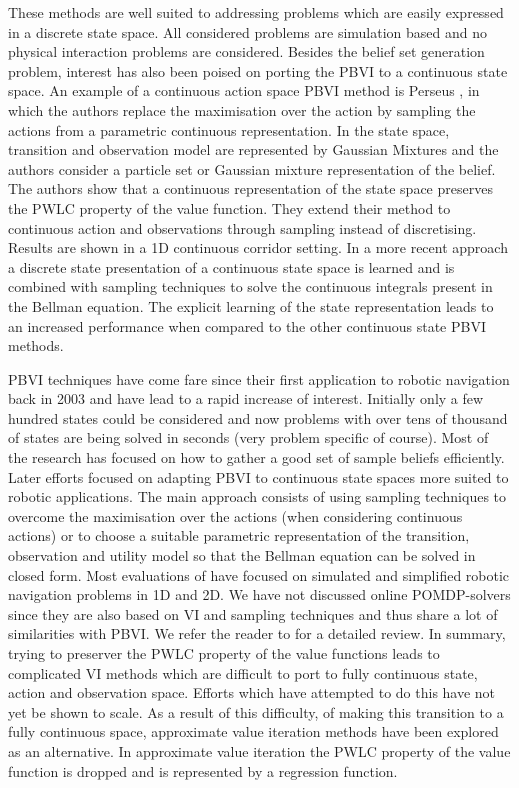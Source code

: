 These methods are well suited to addressing problems which are easily expressed in a discrete state space. All considered problems are simulation based and 
no physical interaction problems are considered. Besides the belief set generation problem, interest has also been poised on porting the PBVI to a continuous state space.
An example of a continuous action space PBVI method is Perseus \cite{Spaan05icra}, in which the authors replace the maximisation over the action by sampling the actions from a 
parametric continuous representation. In \cite{PBVI_C_2006} the state space, transition and observation model are represented by Gaussian Mixtures and the authors consider a particle set or Gaussian mixture representation of the belief. 
The authors show that a continuous representation of the state space preserves the PWLC property of the value function. They extend their method to continuous action and observations 
through sampling instead of discretising. Results are shown in a 1D continuous corridor setting. In a 
more recent approach \cite{solving_continous_pomdps_2013} a discrete state presentation of a continuous state space is learned and is combined with sampling
techniques to solve the continuous integrals present in the Bellman equation. The explicit learning of the state representation leads to an increased performance
when compared to the other continuous state PBVI methods. 

PBVI techniques have come fare since their first application to robotic navigation back in 2003 and have lead to a rapid increase of interest. 
Initially only a few hundred states could be considered and now problems with over tens of thousand of states are being solved in seconds (very problem specific of course). 
Most of the research has focused on how to gather a good set of sample beliefs efficiently. Later efforts focused on adapting PBVI 
to continuous state spaces more suited to robotic applications. The main approach consists of using sampling techniques to overcome 
the maximisation over the actions (when considering continuous actions) or to choose a suitable parametric representation of the transition, observation 
and utility model so that the Bellman equation can be solved in closed form. Most evaluations of have focused on simulated and simplified robotic 
navigation problems in 1D and 2D. We have not discussed online POMDP-solvers since they are also based on VI and sampling techniques and thus share 
a lot of similarities with PBVI. We refer the reader to \cite{Ross08onlineplanning} for a detailed review. In summary, trying to preserver the PWLC property 
of the value functions leads to complicated VI methods which are difficult to port to fully continuous state, action and observation space. Efforts which 
have attempted to do this have not yet be shown to scale. As a result of this difficulty, of making this transition to a fully continuous space, approximate value 
iteration methods have been explored as an alternative. In approximate value iteration the PWLC property of the value function is dropped and is 
represented by a regression function.


